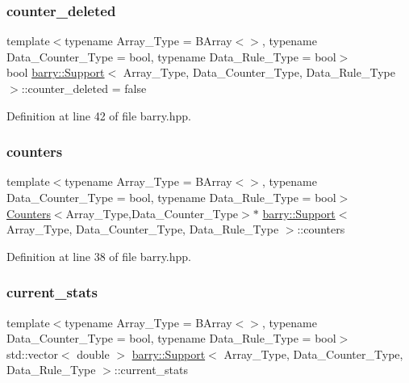 \subsubsection{\texorpdfstring{counter\+\_\+deleted}{counter\_deleted}}
{\footnotesize\ttfamily template$<$typename Array\+\_\+\+Type  = B\+Array$<$$>$, typename Data\+\_\+\+Counter\+\_\+\+Type  = bool, typename Data\+\_\+\+Rule\+\_\+\+Type  = bool$>$ \\
bool \hyperlink{classbarry_1_1_support}{barry\+::\+Support}$<$ Array\+\_\+\+Type, Data\+\_\+\+Counter\+\_\+\+Type, Data\+\_\+\+Rule\+\_\+\+Type $>$\+::counter\+\_\+deleted = false}



Definition at line 42 of file barry.\+hpp.

\mbox{\label{classbarry_1_1_support_a4f02bd235d4c7eccfe167edbc7ebe596}} 
\subsubsection{\texorpdfstring{counters}{counters}}
{\footnotesize\ttfamily template$<$typename Array\+\_\+\+Type  = B\+Array$<$$>$, typename Data\+\_\+\+Counter\+\_\+\+Type  = bool, typename Data\+\_\+\+Rule\+\_\+\+Type  = bool$>$ \\
\hyperlink{classbarry_1_1_counters}{Counters}$<$Array\+\_\+\+Type,Data\+\_\+\+Counter\+\_\+\+Type$>$$\ast$ \hyperlink{classbarry_1_1_support}{barry\+::\+Support}$<$ Array\+\_\+\+Type, Data\+\_\+\+Counter\+\_\+\+Type, Data\+\_\+\+Rule\+\_\+\+Type $>$\+::counters}



Definition at line 38 of file barry.\+hpp.

\mbox{\label{classbarry_1_1_support_aa69d5a47e5ee039b19f42edacd5453d4}} 
\subsubsection{\texorpdfstring{current\+\_\+stats}{current\_stats}}
{\footnotesize\ttfamily template$<$typename Array\+\_\+\+Type  = B\+Array$<$$>$, typename Data\+\_\+\+Counter\+\_\+\+Type  = bool, typename Data\+\_\+\+Rule\+\_\+\+Type  = bool$>$ \\
std\+::vector$<$ double $>$ \hyperlink{classbarry_1_1_support}{barry\+::\+Support}$<$ Array\+\_\+\+Type, Data\+\_\+\+Counter\+\_\+\+Type, Data\+\_\+\+Rule\+\_\+\+Type $>$\+::current\+\_\+stats}



